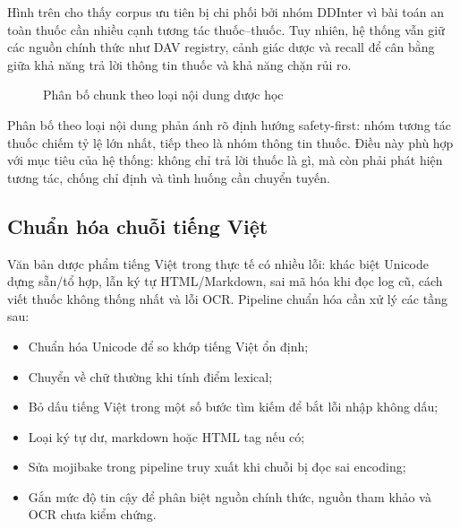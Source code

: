 Hình trên cho thấy corpus ưu tiên bị chi phối bởi nhóm DDInter vì bài toán an toàn thuốc cần nhiều cạnh tương tác thuốc--thuốc. Tuy nhiên, hệ thống vẫn giữ các nguồn chính thức như DAV registry, cảnh giác dược và recall để cân bằng giữa khả năng trả lời thông tin thuốc và khả năng chặn rủi ro.

\begin{figure}[H]
\centering
{}
\caption{Phân bố chunk theo loại nội dung dược học}
\end{figure}

Phân bố theo loại nội dung phản ánh rõ định hướng safety-first: nhóm tương tác thuốc chiếm tỷ lệ lớn nhất, tiếp theo là nhóm thông tin thuốc. Điều này phù hợp với mục tiêu của hệ thống: không chỉ trả lời thuốc là gì, mà còn phải phát hiện tương tác, chống chỉ định và tình huống cần chuyển tuyến.

\subsection{Chuẩn hóa chuỗi tiếng Việt}

Văn bản dược phẩm tiếng Việt trong thực tế có nhiều lỗi: khác biệt Unicode dựng sẵn/tổ hợp, lẫn ký tự HTML/Markdown, sai mã hóa khi đọc log cũ, cách viết thuốc không thống nhất và lỗi OCR. Pipeline chuẩn hóa cần xử lý các tầng sau:

\begin{itemize}
  \item Chuẩn hóa Unicode để so khớp tiếng Việt ổn định;
  \item Chuyển về chữ thường khi tính điểm lexical;
  \item Bỏ dấu tiếng Việt trong một số bước tìm kiếm để bắt lỗi nhập không dấu;
  \item Loại ký tự dư, markdown hoặc HTML tag nếu có;
  \item Sửa mojibake trong pipeline truy xuất khi chuỗi bị đọc sai encoding;
  \item Gắn mức độ tin cậy để phân biệt nguồn chính thức, nguồn tham khảo và OCR chưa kiểm chứng.
\end{itemize}

